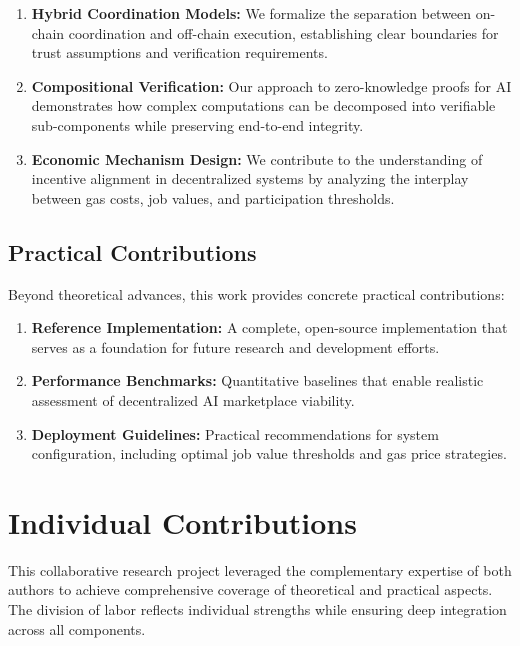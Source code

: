 \begin{enumerate}
    \item \textbf{Hybrid Coordination Models:} We formalize the separation between on-chain coordination and off-chain execution, establishing clear boundaries for trust assumptions and verification requirements.
    
    \item \textbf{Compositional Verification:} Our approach to zero-knowledge proofs for AI demonstrates how complex computations can be decomposed into verifiable sub-components while preserving end-to-end integrity.
    
    \item \textbf{Economic Mechanism Design:} We contribute to the understanding of incentive alignment in decentralized systems by analyzing the interplay between gas costs, job values, and participation thresholds.
\end{enumerate}

\subsection{Practical Contributions}

Beyond theoretical advances, this work provides concrete practical contributions:

\begin{enumerate}
    \item \textbf{Reference Implementation:} A complete, open-source implementation that serves as a foundation for future research and development efforts.
    
    \item \textbf{Performance Benchmarks:} Quantitative baselines that enable realistic assessment of decentralized AI marketplace viability.
    
    \item \textbf{Deployment Guidelines:} Practical recommendations for system configuration, including optimal job value thresholds and gas price strategies.
\end{enumerate}

\section{Individual Contributions}

This collaborative research project leveraged the complementary expertise of both authors to achieve comprehensive coverage of theoretical and practical aspects. The division of labor reflects individual strengths while ensuring deep integration across all components.

